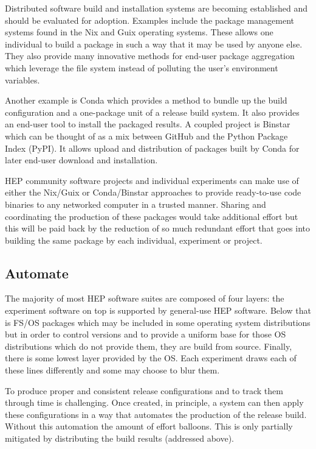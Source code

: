 Distributed software build and installation systems are becoming
established and should be evaluated for adoption.  Examples include
the package management systems found in the Nix and Guix operating
systems.  These allows one individual to build a package in such a way
that it may be used by anyone else.  They also provide many innovative
methods for end-user package aggregation which leverage the file
system instead of polluting the user's environment variables.

Another example is Conda which provides a method to bundle up the
build configuration and a one-package unit of a release build system.
It also provides an end-user tool to install the packaged results.  A
coupled project is Binstar which can be thought of as a mix between
GitHub and the Python Package Index (PyPI).  It allows upload and
distribution of packages built by Conda for later end-user download
and installation.

HEP community software projects and individual experiments can make
use of either the Nix/Guix or Conda/Binstar approaches to provide
ready-to-use code binaries to any networked computer in a trusted
manner.
%
Sharing and coordinating the production of these packages would take
additional effort but this will be paid back by the reduction of so
much redundant effort that goes into building the same package by each
individual, experiment or project.


\subsection{Automate}

The majority of most HEP software suites are composed of four layers:
the experiment software on top is supported by general-use HEP
software.  Below that is FS/OS packages which may be included in some
operating system distributions but in order to control versions and to
provide a uniform base for those OS distributions which do not provide
them, they are build from source.  Finally, there is some lowest layer
provided by the OS.  Each experiment draws each of these lines
differently and some may choose to blur them.

To produce proper and consistent release configurations and to track
them through time is challenging.  Once created, in principle, a
system can then apply these configurations in a way that automates the
production of the release build.  Without this automation the amount
of effort balloons.  This is only partially mitigated by distributing
the build results (addressed above).

